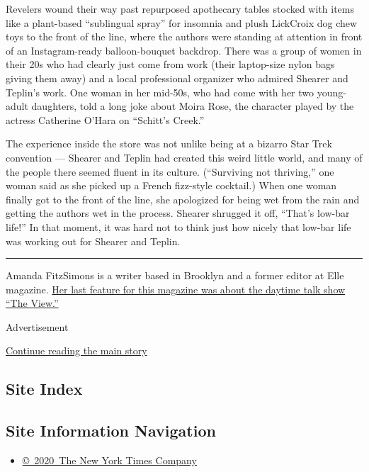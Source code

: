 Revelers wound their way past repurposed apothecary tables stocked with
items like a plant-based ``sublingual spray'' for insomnia and plush
LickCroix dog chew toys to the front of the line, where the authors were
standing at attention in front of an Instagram-ready balloon-bouquet
backdrop. There was a group of women in their 20s who had clearly just
come from work (their laptop-size nylon bags giving them away) and a
local professional organizer who admired Shearer and Teplin's work. One
woman in her mid-50s, who had come with her two young-adult daughters,
told a long joke about Moira Rose, the character played by the actress
Catherine O'Hara on ``Schitt's Creek.''

The experience inside the store was not unlike being at a bizarro Star
Trek convention --- Shearer and Teplin had created this weird little
world, and many of the people there seemed fluent in its culture.
(``Surviving not thriving,'' one woman said as she picked up a French
fizz-style cocktail.) When one woman finally got to the front of the
line, she apologized for being wet from the rain and getting the authors
wet in the process. Shearer shrugged it off, ``That's low-bar life!'' In
that moment, it was hard not to think just how nicely that low-bar life
was working out for Shearer and Teplin.

\begin{center}\rule{0.5\linewidth}{\linethickness}\end{center}

Amanda FitzSimons is a writer based in Brooklyn and a former editor at
Elle magazine.
\href{https://www.nytimes3xbfgragh.onion/2019/05/22/magazine/the-view-politics-tv.html}{Her
last feature for this magazine was about the daytime talk show ``The
View.''}

Advertisement

\protect\hyperlink{after-bottom}{Continue reading the main story}

\hypertarget{site-index}{%
\subsection{Site Index}\label{site-index}}

\hypertarget{site-information-navigation}{%
\subsection{Site Information
Navigation}\label{site-information-navigation}}

\begin{itemize}
\tightlist
\item
  \href{https://help.nytimes3xbfgragh.onion/hc/en-us/articles/115014792127-Copyright-notice}{©~2020~The
  New York Times Company}
\end{itemize}

